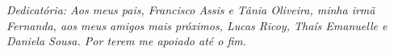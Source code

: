 


\begin{newpage}
	\thispagestyle{empty}
	\setlength{\baselineskip}{1.5\baselineskip} %
	\begin{flushright}
	
		\begin{minipage}{12cm} 
		\vspace{15cm}		
		\textit{Dedicatória: Aos meus pais, Francisco Assis e Tânia Oliveira, minha irmã Fernanda, aos meus amigos mais próximos, Lucas Ricoy, Thaís Emanuelle e Daniela Sousa. Por terem me apoiado até o fim.}
		\end{minipage}
	\end{flushright}
\end{newpage}

\clearpage